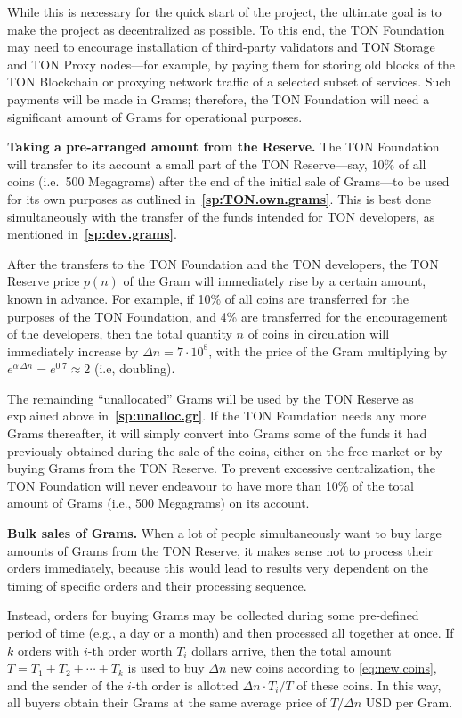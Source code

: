 \documentclass[12pt,oneside]{article}
\def\makepoint#1{\medbreak\noindent{\bf #1.\ }}
\def\nxpoint{\refstepcounter{subsection}%
  \smallbreak\makepoint{\thesubsection}}
\def\nxsubpoint{\refstepcounter{subsubsection}%
  \smallbreak\makepoint{\thesubsubsection}}
\def\refpoint#1{{\rm\textbf{\ref{#1}}}}
\let\ptref=\refpoint
\def\embt(#1.){\textbf{#1.}}
\begin{document}
While this is necessary for the quick start of the project, the
ultimate goal is to make the project as decentralized as possible. To
this end, the TON Foundation may need to encourage installation of
third-party validators and TON Storage and TON Proxy nodes---for
example, by paying them for storing old blocks of the TON Blockchain
or proxying network traffic of a selected subset of services. Such
payments will be made in Grams; therefore, the TON Foundation will
need a significant amount of Grams for operational purposes.

\nxsubpoint \embt(Taking a pre-arranged amount from the Reserve.) The
TON Foundation will transfer to its account a small part of the TON
Reserve---say, 10\% of all coins (i.e.\ 500 Megagrams) after the end
of the initial sale of Grams---to be used for its own purposes as
outlined in~\ptref{sp:TON.own.grams}. This is best done simultaneously
with the transfer of the funds intended for TON developers, as
mentioned in~\ptref{sp:dev.grams}.

After the transfers to the TON Foundation and the TON developers, the
TON Reserve price $p(n)$ of the Gram will immediately rise by a
certain amount, known in advance. For example, if 10\% of all coins
are transferred for the purposes of the TON Foundation, and 4\% are
transferred for the encouragement of the developers, then the total
quantity $n$ of coins in circulation will immediately increase by
$\Delta n=7\cdot10^8$, with the price of the Gram multiplying by
$e^{\alpha\,\Delta n}=e^{0.7}\approx 2$ (i.e, doubling).

The remainding ``unallocated'' Grams will be used by the TON Reserve
as explained above in~\ptref{sp:unalloc.gr}. If the TON Foundation
needs any more Grams thereafter, it will simply convert into Grams
some of the funds it had previously obtained during the sale of the
coins, either on the free market or by buying Grams from the TON
Reserve.  To prevent excessive centralization, the TON Foundation will
never endeavour to have more than 10\% of the total amount of Grams
(i.e., 500 Megagrams) on its account.

\nxpoint\label{sp:bulk.sales} \embt(Bulk sales of Grams.)  When a lot
of people simultaneously want to buy large amounts of Grams from the
TON Reserve, it makes sense not to process their orders immediately,
because this would lead to results very dependent on the timing of
specific orders and their processing sequence.

Instead, orders for buying Grams may be collected during some
pre-defined period of time (e.g., a day or a month) and then processed
all together at once. If $k$ orders with $i$-th order worth $T_i$
dollars arrive, then the total amount $T=T_1+T_2+\cdots+T_k$ is used
to buy $\Delta n$ new coins according to \eqref{eq:new.coins}, and the
sender of the $i$-th order is allotted $\Delta n\cdot T_i/T$ of these
coins. In this way, all buyers obtain their Grams at the same average
price of $T/\Delta n$ USD per Gram.
\end{document}
